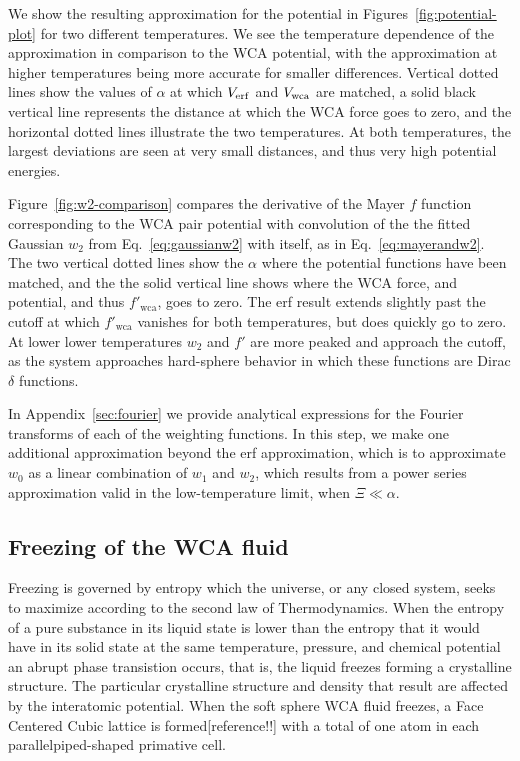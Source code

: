 \documentclass[letterpaper,twocolumn,amsmath,amssymb,prb]{revtex4-1}
\begin{document}
We show the resulting approximation
for the potential in Figures~\ref{fig:potential-plot} for two
different temperatures.  We see the temperature dependence of the
approximation in comparison to the WCA potential, with the
approximation at higher temperatures being more accurate for smaller
differences. Vertical dotted lines show the values of $\alpha$ at
which $V_{\mathrm{erf}}$ and $V_{\mathrm{wca}}$ are matched, a solid black vertical line
represents the distance at which the WCA force goes to zero, and the
horizontal dotted lines illustrate the two temperatures.  At both
temperatures, the largest deviations are seen at very small distances,
and thus very high potential energies.

Figure~\ref{fig:w2-comparison} compares the derivative of the Mayer $f$
function corresponding to the WCA pair potential with convolution of
the the fitted Gaussian $w_2$ from Eq.~\ref{eq:gaussianw2} with
itself, as in Eq.~\ref{eq:mayerandw2}.  The two vertical dotted lines
show the $\alpha$ where the potential functions have been matched, and
the the solid vertical line shows where the WCA force, and potential,
and thus $f'_{\mathrm{wca}}$, goes to zero. The erf result extends
slightly past the cutoff at which $f'_{\mathrm{wca}}$ vanishes for
both temperatures, but does quickly go to zero. At lower lower
temperatures $w_2$ and $f'$ are more peaked and approach the cutoff, as
the system approaches hard-sphere behavior in which these functions
are Dirac $\delta$ functions.

In Appendix~\ref{sec:fourier} we provide analytical expressions for
the Fourier transforms of each of the weighting functions.  In this
step, we make one additional approximation beyond the erf
approximation, which is to approximate $w_0$ as a linear combination
of $w_1$ and $w_2$, which results from a power series approximation
valid in the low-temperature limit, when $\Xi\ll\alpha$.

\subsection{Freezing of the WCA fluid}

Freezing is governed by entropy which the universe, or any closed system, seeks to maximize according to the second law of Thermodynamics. When the entropy of a pure substance in its liquid state is lower than the entropy that it would have in its solid state at the same temperature, pressure, and chemical potential an abrupt phase transistion occurs, that is, the liquid freezes forming a crystalline structure. The particular crystalline structure and density that result are affected by the interatomic potential. When the soft sphere WCA fluid freezes, a Face Centered Cubic lattice is formed[reference!!] with a total of one atom in each parallelpiped-shaped primative cell. 
\end{document}
